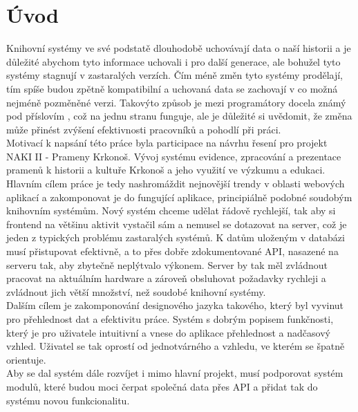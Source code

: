 \chapter*{Úvod}
Knihovní systémy ve své podstatě dlouhodobě uchovávají data o naší historii a je důležité abychom
tyto informace uchovali i pro další generace, ale bohužel tyto systémy stagnují v
zastaralých verzích. Čím méně změn tyto systémy prodělají, tím spíše budou zpětně
kompatibilní a uchovaná data se zachovají v co možná nejméně pozměněné verzi.
Takovýto způsob je mezi programátory docela známý pod příslovím
, což na jednu stranu funguje, ale
je důležité si uvědomit, že změna může přinést
zvýšení efektivnosti pracovníků a pohodlí při práci.
\\

Motivací k napsání této práce byla participace na návrhu řesení
pro projekt NAKI II - Prameny Krkonoš. Vývoj systému evidence,
zpracování a prezentace pramenů k historii a kultuře Krkonoš a
jeho využití ve výzkumu a edukaci. 
\\

Hlavním cílem práce je tedy nashromáždit nejnovější trendy v oblasti webových
aplikací a zakomponovat je do fungující aplikace, principiálně podobné
soudobým knihovním systémům. Nový systém chceme udělat řádově rychlejší,
tak aby si frontend na většinu aktivit vystačil sám a nemusel se dotazovat
na server, což je jeden z typických problému zastaralých systémů.
K datům uloženým v databázi musí přistupovat efektivně, a to přes
dobře zdokumentované API, nasazené na serveru tak, aby zbytečně
neplýtvalo výkonem. Server by tak měl zvládnout pracovat na
aktuálním hardware a zároveň obsluhovat požadavky rychleji a
zvládnout jich větší množství, než soudobé knihovní systémy.
\\

Dalším cílem je zakomponování designového jazyka takového,
který byl vyvinut pro přehlednost dat a efektivitu práce.
Systém s dobrým popisem funkčnosti, který je pro uživatele 
intuitivní a vnese do aplikace přehlednost a nadčasový vzhled.
Uživatel se tak oprostí od jednotvárného a  vzhledu,
ve kterém se špatně orientuje.
\\

Aby se dal systém dále rozvíjet i mimo hlavní projekt, musí
podporovat systém modulů, které budou moci čerpat společná data přes
API a přidat tak do systému novou funkcionalitu.

